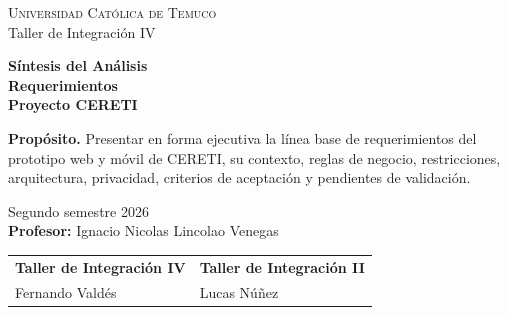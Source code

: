 \documentclass[10pt,a4paper,oneside]{article}
\begin{document}
\shorthandoff{<>}

\begin{titlepage}
  \thispagestyle{empty}
  \vspace*{1.8cm}
  \hspace*{0.9cm}\begin{minipage}{0.86\textwidth}
    {\large\color{azuluct}\textsc{Universidad Católica de Temuco}}\\[0.25cm]
    {\normalsize\color{gristexto}Taller de Integración IV}\par
    \vspace{1.35cm}
    {\Huge\bfseries\color{azuluct}Síntesis del Análisis\\[-0.05cm]
    Requerimientos\\[0.2cm]
    \Large\color{gristexto}Proyecto CERETI}
    \vspace{1.15cm}
    \begin{tcolorbox}[colback=white,colframe=grislinea,boxrule=0.5pt,arc=1mm,left=3mm,right=3mm]
      \textbf{Propósito.} Presentar en forma ejecutiva la línea base de requerimientos del prototipo web y móvil de CERETI, su contexto, reglas de negocio, restricciones, arquitectura, privacidad, criterios de aceptación y pendientes de validación.
    \end{tcolorbox}
    \vspace{1.15cm}
    {\large Segundo semestre 2026}\\[0.5cm]
    \textbf{Profesor:} Ignacio Nicolas Lincolao Venegas
  \end{minipage}\par
  \vspace{1.8cm}
  \noindent\hspace*{0.9cm}\begin{minipage}{0.86\textwidth}
    \small
    \begin{tabular}{@{}p{5.8cm}p{6.8cm}@{}}
      \textbf{Taller de Integración IV} & \textbf{Taller de Integración II}\\
      Fernando Valdés & Lucas Núñez\\

\end{tabular}
\end{minipage}
\end{titlepage}
\end{document}
